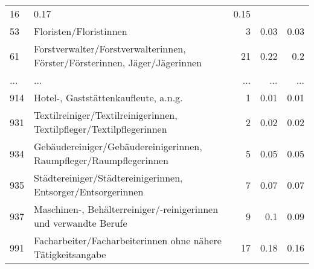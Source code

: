\begin{longtable}{lXrrr}
          \num{16} &
          \num[round-mode=places,round-precision=2]{0,17} &
          \num[round-mode=places,round-precision=2]{0,15} \\
        53 & \multicolumn{1}{X}{Floristen/Floristinnen} & %
          \num{3} &
          \num[round-mode=places,round-precision=2]{0,03} &
          \num[round-mode=places,round-precision=2]{0,03} \\
        61 & \multicolumn{1}{X}{Forstverwalter/Forstverwalterinnen, Förster/Försterinnen, Jäger/Jägerinnen} & %
          \num{21} &
          \num[round-mode=places,round-precision=2]{0,22} &
          \num[round-mode=places,round-precision=2]{0,2} \\
       ... & ... & ... & ... & ... \\
        914 & \multicolumn{1}{X}{Hotel-, Gaststättenkaufleute, a.n.g.} & %
          \num{1} &
          \num[round-mode=places,round-precision=2]{0,01} &
          \num[round-mode=places,round-precision=2]{0,01} \\

        931 & \multicolumn{1}{X}{Textilreiniger/Textilreinigerinnen, Textilpfleger/Textilpflegerinnen} & %
          \num{2} &
          \num[round-mode=places,round-precision=2]{0,02} &
          \num[round-mode=places,round-precision=2]{0,02} \\

        934 & \multicolumn{1}{X}{Gebäudereiniger/Gebäudereinigerinnen, Raumpfleger/Raumpflegerinnen} & %
          \num{5} &
          \num[round-mode=places,round-precision=2]{0,05} &
          \num[round-mode=places,round-precision=2]{0,05} \\

        935 & \multicolumn{1}{X}{Städtereiniger/Städtereinigerinnen, Entsorger/Entsorgerinnen} & %
          \num{7} &
          \num[round-mode=places,round-precision=2]{0,07} &
          \num[round-mode=places,round-precision=2]{0,07} \\

        937 & \multicolumn{1}{X}{Maschinen-, Behälterreiniger/-reinigerinnen und verwandte Berufe} & %
          \num{9} &
          \num[round-mode=places,round-precision=2]{0,1} &
          \num[round-mode=places,round-precision=2]{0,09} \\

        991 & \multicolumn{1}{X}{Facharbeiter/Facharbeiterinnen ohne nähere Tätigkeitsangabe} & %
          \num{17} &
          \num[round-mode=places,round-precision=2]{0,18} &
          \num[round-mode=places,round-precision=2]{0,16} \\


\end{longtable}

